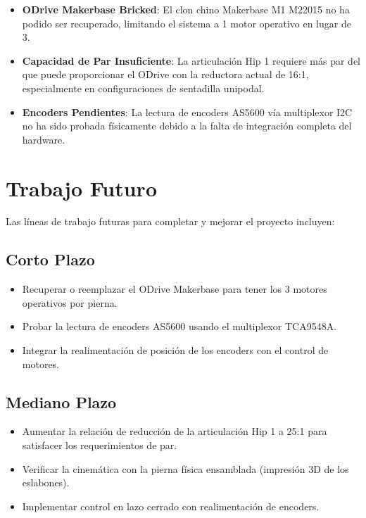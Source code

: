\begin{itemize}
    \item \textbf{ODrive Makerbase Bricked}: El clon chino Makerbase M1 M22015 no ha podido ser recuperado, limitando el sistema a 1 motor operativo en lugar de 3.
    
    \item \textbf{Capacidad de Par Insuficiente}: La articulación Hip 1 requiere más par del que puede proporcionar el ODrive con la reductora actual de 16:1, especialmente en configuraciones de sentadilla unipodal.
    
    \item \textbf{Encoders Pendientes}: La lectura de encoders AS5600 vía multiplexor I2C no ha sido probada físicamente debido a la falta de integración completa del hardware.
\end{itemize}

\section{Trabajo Futuro}

Las líneas de trabajo futuras para completar y mejorar el proyecto incluyen:

\subsection{Corto Plazo}
\begin{itemize}
    \item Recuperar o reemplazar el ODrive Makerbase para tener los 3 motores operativos por pierna.
    \item Probar la lectura de encoders AS5600 usando el multiplexor TCA9548A.
    \item Integrar la realimentación de posición de los encoders con el control de motores.
\end{itemize}

\subsection{Mediano Plazo}
\begin{itemize}
    \item Aumentar la relación de reducción de la articulación Hip 1 a 25:1 para satisfacer los requerimientos de par.
    \item Verificar la cinemática con la pierna física ensamblada (impresión 3D de los eslabones).
    \item Implementar control en lazo cerrado con realimentación de encoders.
\end{itemize}

